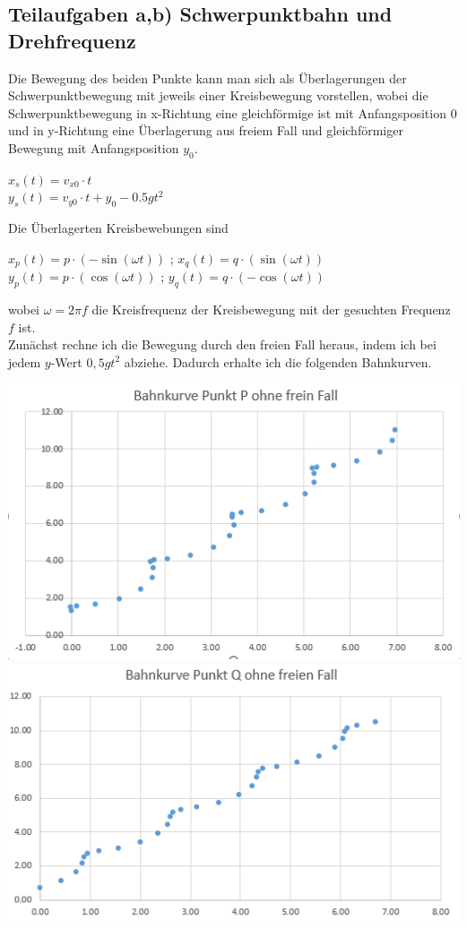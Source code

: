 \documentclass{article}
\begin{document}
\subsection*{Teilaufgaben a,b) Schwerpunktbahn und Drehfrequenz}
Die Bewegung des beiden Punkte kann man sich als Überlagerungen der Schwerpunktbewegung mit jeweils einer Kreisbewegung vorstellen, wobei die Schwerpunktbewegung in x-Richtung eine gleichförmige ist mit 
Anfangsposition 0 und in y-Richtung eine Überlagerung aus freiem Fall und gleichförmiger Bewegung mit Anfangsposition $y_0$.
\begin{center}
	$x_s (t)= v_{x0}\cdot t$ \\
	$y_s (t) = v_{y0}\cdot t + y_0 -0.5 g t^2$
\end{center}   
Die Überlagerten Kreisbewebungen sind
\begin{center}
	$x_p (t) = p \cdot (-\sin(\omega t))$ ; $x_q (t)= q \cdot (\sin(\omega t)) $\\
	$y_p (t) = p \cdot (\cos(\omega t))$ ; $y_q (t)= q \cdot (-\cos(\omega t)) $
\end{center} 
wobei $\omega = 2\pi f $ die Kreisfrequenz der Kreisbewegung mit der gesuchten Frequenz $f$ ist.\\
Zunächst rechne ich die Bewegung durch den freien Fall heraus, 
indem ich bei jedem $y$-Wert $0,5gt^2$ abziehe. Dadurch erhalte ich die folgenden Bahnkurven.
\begin{center}
	\includegraphics[scale=0.38]{Kurve-P-Punkt-ohne-freien-Fall.png}
	\includegraphics[scale=0.42]{Kurve-Q-Punkt-ohne-freien-Fall.png}
\end{center}
\end{document}
